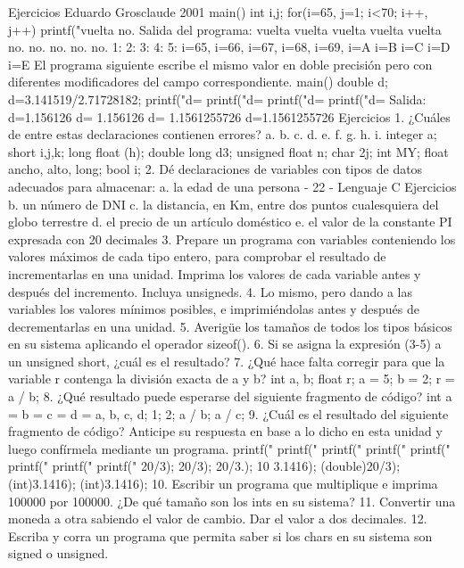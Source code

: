 Ejercicios
Eduardo Grosclaude 2001
main()
{
int i,j;
for(i=65, j=1; i<70; i++, j++)
printf("vuelta no. %
}
Salida del programa:
vuelta
vuelta
vuelta
vuelta
vuelta
no.
no.
no.
no.
no.
1:
2:
3:
4:
5:
i=65,
i=66,
i=67,
i=68,
i=69,
i=A
i=B
i=C
i=D
i=E
El programa siguiente escribe el mismo valor en doble precisión pero con diferentes
modificadores del campo correspondiente.
main()
{
double d;
d=3.141519/2.71728182;
printf("d=%
printf("d=%
printf("d=%
printf("d=%
}
Salida:
d=1.156126
d=
1.156126
d=
1.1561255726
d=1.1561255726
Ejercicios
1. ¿Cuáles de entre estas declaraciones contienen errores?
a.
b.
c.
d.
e.
f.
g.
h.
i.
integer a;
short i,j,k;
long float (h);
double long d3;
unsigned float n;
char 2j;
int MY;
float ancho, alto, long;
bool i;
2. Dé declaraciones de variables con tipos de datos adecuados para almacenar:
a. la edad de una persona
- 22 -
Lenguaje C
Ejercicios
b. un número de DNI
c. la distancia, en Km, entre dos puntos cualesquiera del globo terrestre
d. el precio de un artículo doméstico
e. el valor de la constante PI expresada con 20 decimales
3. Prepare un programa con variables conteniendo los valores máximos de cada tipo entero, para
comprobar el resultado de incrementarlas en una unidad. Imprima los valores de cada variable antes y
después del incremento. Incluya unsigneds.
4. Lo mismo, pero dando a las variables los valores mínimos posibles, e imprimiéndolas antes y
después de decrementarlas en una unidad.
5. Averigüe los tamaños de todos los tipos básicos en su sistema aplicando el operador sizeof().
6. Si se asigna la expresión (3-5) a un unsigned short, ¿cuál es el resultado?
7. ¿Qué hace falta corregir para que la variable r contenga la división exacta de a y b?
int a, b;
float r;
a = 5;
b = 2;
r = a / b;
8. ¿Qué resultado puede esperarse del siguiente fragmento de código?
int
a =
b =
c =
d =
a, b, c, d;
1;
2;
a / b;
a / c;
9. ¿Cuál es el resultado del siguiente fragmento de código? Anticipe su respuesta en base a lo dicho en
esta unidad y luego confírmela mediante un programa.
printf("%
printf("%
printf("%
printf("%
printf("%
printf("%
printf("%
printf("%
20/3);
20/3);
20/3.);
10%
3.1416);
(double)20/3);
(int)3.1416);
(int)3.1416);
10. Escribir un programa que multiplique e imprima 100000 por 100000. ¿De qué tamaño son los ints
en su sistema?
11. Convertir una moneda a otra sabiendo el valor de cambio. Dar el valor a dos decimales.
12. Escriba y corra un programa que permita saber si los chars en su sistema son signed o unsigned.
